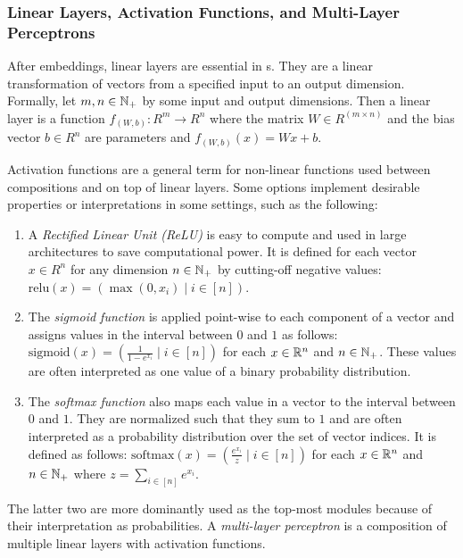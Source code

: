 \documentclass[../document.tex]{subfiles}
\begin{document}
    \subsubsection{Linear Layers, Activation Functions, and Multi-Layer Perceptrons}
    After embeddings, linear layers are essential in s.
    They are a linear transformation of vectors from a specified input to an output dimension.
    Formally, let \(m, n \in \mathbb{N}_+\) by some input and output dimensions.
    Then a linear layer is a function \(f_{(W,b)}\colon R^m \to R^n\) where the matrix \(W \in R^{(m\times n)}\) and the bias vector \(b\in R^n\) are parameters and \(f_{(W,b)}(x) = Wx+b\).

    Activation functions are a general term for non-linear functions used between compositions and on top of linear layers.
    Some options implement desirable properties or interpretations in some settings, such as the following:
    \begin{enumerate}
        \item
            A \emph{Rectified Linear Unit (ReLU)} is easy to compute and used in large architectures to save computational power.
            It is defined for each vector \(x\in R^n\) for any dimension \(n \in \mathbb{N}_+\) by cutting-off negative values: \(\mathrm{relu}(x) = (\max(0, x_i) \mid i \in [n])\).
        \item
            The \emph{sigmoid function} is applied point-wise to each component of a vector and assigns values in the interval between \(0\) and \(1\) as follows: \(\mathrm{sigmoid}(x) = (\frac{1}{1-e^{x_i}} \mid i \in [n])\) for each \(x \in \mathbb{R}^n\) and \(n \in \mathbb{N}_+\).
            These values are often interpreted as one value of a binary probability distribution.
        \item
            The \emph{softmax function} also maps each value in a vector to the interval between \(0\) and \(1\).
            They are normalized such that they sum to \(1\) and are often interpreted as a probability distribution over the set of vector indices.
            It is defined as follows: \(\mathrm{softmax}(x) = (\frac{e^{x_i}}{z} \mid i \in [n])\) for each \(x\in \mathbb{R}^n\) and \(n \in \mathbb{N}_+\) where \(z = \sum_{i \in [n]} e^{x_i}\).
    \end{enumerate}
    The latter two are more dominantly used as the top-most modules because of their interpretation as probabilities.
    A \emph{multi-layer perceptron} is a composition of multiple linear layers with activation functions.
\end{document}
